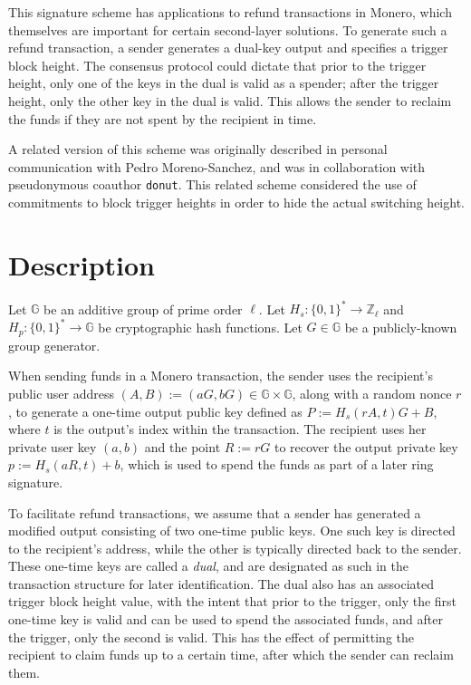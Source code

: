 \documentclass{mrl}
\begin{document}
This signature scheme has applications to refund transactions in Monero, which themselves are important for certain second-layer solutions. To generate such a refund transaction, a sender generates a dual-key output and specifies a trigger block height. The consensus protocol could dictate that prior to the trigger height, only one of the keys in the dual is valid as a spender; after the trigger height, only the other key in the dual is valid. This allows the sender to reclaim the funds if they are not spent by the recipient in time.

A related version of this scheme was originally described in personal communication with Pedro Moreno-Sanchez, and was in collaboration with pseudonymous coauthor \texttt{donut}. This related scheme considered the use of commitments to block trigger heights in order to hide the actual switching height.

\section{Description}
Let $\mathbb{G}$ be an additive group of prime order $\ell$. Let $H_s: \{0,1\}^* \to \mathbb{Z}_\ell$ and $H_p: \{0,1\}^* \to \mathbb{G}$ be cryptographic hash functions. Let $G \in \mathbb{G}$ be a publicly-known group generator.

When sending funds in a Monero transaction, the sender uses the recipient's public user address $(A,B) := (aG,bG) \in \mathbb{G} \times \mathbb{G}$, along with a random nonce $r$, to generate a one-time output public key defined as $P := H_s(rA,t)G + B$, where $t$ is the output's index within the transaction. The recipient uses her private user key $(a,b)$ and the point $R := rG$ to recover the output private key $p := H_s(aR,t) + b$, which is used to spend the funds as part of a later ring signature.

To facilitate refund transactions, we assume that a sender has generated a modified output consisting of two one-time public keys. One such key is directed to the recipient's address, while the other is typically directed back to the sender. These one-time keys are called a \textit{dual}, and are designated as such in the transaction structure for later identification. The dual also has an associated trigger block height value, with the intent that prior to the trigger, only the first one-time key is valid and can be used to spend the associated funds, and after the trigger, only the second is valid. This has the effect of permitting the recipient to claim funds up to a certain time, after which the sender can reclaim them.
\end{document}
